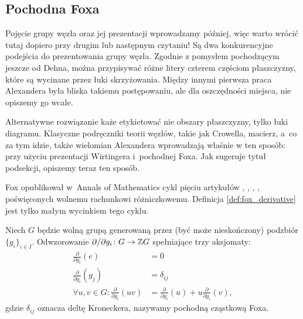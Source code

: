 
\subsection{Pochodna Foxa}
%
Pojęcie grupy węzła oraz jej prezentacji wprowadzamy później, więc warto wrócić tutaj dopiero przy drugim lub następnym czytaniu!
Są dwa konkurencyjne podejścia do prezentowania grupy węzła.
Zgodnie z pomysłem pochodzącym jeszcze od Dehna, można przypisywać różne litery czterem częściom płaszczyzny, które są wycinane przez łuki skrzyżowania.
%
Między innymi pierwsza praca Alexandera była bliska takiemu postępowaniu, ale dla oszczędności miejsca, nie opiszemy go wcale.
%

Alternatywne rozwiązanie każe etykietować nie obszary płaszczyzny, tylko łuki diagramu.
Klasyczne podręczniki teorii węzłów, takie jak \cite{crowell1963} Crowella, macierz, a~co za tym idzie, także wielomian Alexandera wprowadzają właśnie w ten sposób: przy użyciu prezentacji Wirtingera i~pochodnej Foxa.
Jak sugeruje tytuł podsekcji, opiszemy teraz ten sposób.

Fox opublikował w~Annals of Mathematics cykl pięciu artykułów \cite{fox1953}, \cite{fox1954}, \cite{fox1956}, \cite{fox1958}, \cite{fox1960} poświęconych wolnemu rachunkowi różniczkowemu.
%
Definicja \ref{def:fox_derivative} jest tylko małym wycinkiem tego cyklu.

\begin{definition}
\label{def:fox_derivative}%
    Niech $G$ będzie wolną grupą generowaną przez (być może nieskończony) podzbiór $\{g_i\}_{i \in I}$.
    Odwzorowanie $\partial/\partial g_i \colon G \to \mathbb Z G$ spełniające trzy aksjomaty:
    \begin{align}
        \frac{\partial}{\partial g_i} (e) & = 0 \\
        \frac{\partial}{\partial g_i} (g_j) & = \delta_{ij} \\
        \forall u, v \in G : \frac{\partial}{\partial g_i} (uv) & = \frac{\partial}{\partial g_i}(u) + u \frac{\partial}{\partial g_i} (v),
    \end{align}
    gdzie $\delta_{ij}$ oznacza deltę Kroneckera, nazywamy pochodną cząstkową Foxa.
\end{definition}

